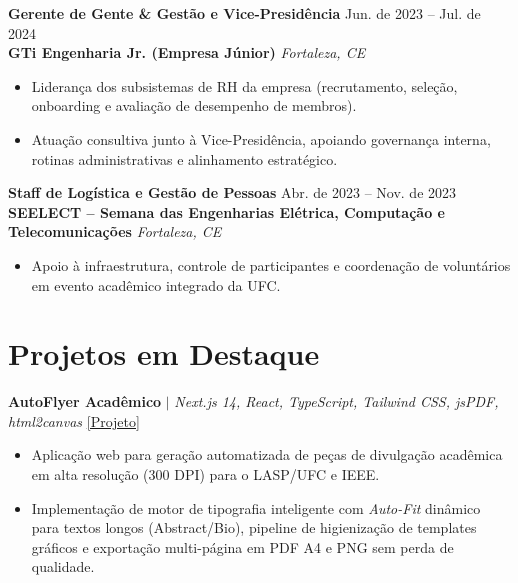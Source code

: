 \documentclass[a4paper,10pt]{article}
\begin{document}
\vspace{3pt}

\noindent\textbf{Gerente de Gente \& Gestão e Vice-Presidência} \hfill Jun. de 2023 -- Jul. de 2024\\
\textbf{GTi Engenharia Jr. (Empresa Júnior)} \hfill \textit{Fortaleza, CE}
\begin{itemize}
  \item Liderança dos subsistemas de RH da empresa (recrutamento, seleção, onboarding e avaliação de desempenho de membros).
  \item Atuação consultiva junto à Vice-Presidência, apoiando governança interna, rotinas administrativas e alinhamento estratégico.
\end{itemize}

\vspace{3pt}

\noindent\textbf{Staff de Logística e Gestão de Pessoas} \hfill Abr. de 2023 -- Nov. de 2023\\
\textbf{SEELECT -- Semana das Engenharias Elétrica, Computação e Telecomunicações} \hfill \textit{Fortaleza, CE}
\begin{itemize}
  \item Apoio à infraestrutura, controle de participantes e coordenação de voluntários em evento acadêmico integrado da UFC.
\end{itemize}

\section{Projetos em Destaque}

\noindent\textbf{AutoFlyer Acadêmico} $\vert$ \textit{Next.js 14, React, TypeScript, Tailwind CSS, jsPDF, html2canvas} \hfill \href{https://github.com/Loogan23}{[Projeto]}
\begin{itemize}
  \item Aplicação web para geração automatizada de peças de divulgação acadêmica em alta resolução (300 DPI) para o LASP/UFC e IEEE.
  \item Implementação de motor de tipografia inteligente com \textit{Auto-Fit} dinâmico para textos longos (Abstract/Bio), pipeline de higienização de templates gráficos e exportação multi-página em PDF A4 e PNG sem perda de qualidade.
\end{itemize}

\vspace{3pt}
\end{document}
